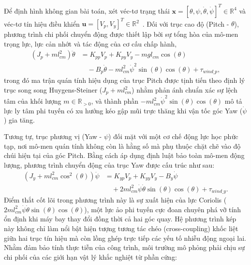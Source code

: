 \documentclass[conference, a4paper]{IEEEtran}
\begin{document}
Để định hình không gian bài toán, xét véc-tơ trạng thái $\mathbf{x} = [\theta, \psi, \dot{\theta}, \dot{\psi}]^T \in \mathbb{R}^4$ và véc-tơ tín hiệu điều khiển $\mathbf{u} = [V_p, V_y]^T \in \mathbb{R}^2$~\cite{8592714}. Đối với trục cao độ (Pitch - $\theta$), phương trình chi phối chuyển động được thiết lập bởi sự tổng hòa của mô-men trọng lực, lực cản nhớt và tác động của cơ cấu chấp hành,
\begin{equation}
\begin{aligned}
(J_p + m l_{cm}^2) \ddot{\theta} &= K_{pp} V_p + K_{py} V_y - m g l_{cm} \cos(\theta) \\
&\quad - B_p \dot{\theta} - m l_{cm}^2 \dot{\psi}^2 \sin(\theta)\cos(\theta) + \tau_{wind\_p},
\end{aligned}
\end{equation}
trong đó ma trận quán tính hiệu dụng của trục Pitch được tịnh tiến theo định lý trục song song Huygens-Steiner ($J_p + m l_{cm}^2$) nhằm phản ánh chuẩn xác sự lệch tâm của khối lượng $m \in \mathbb{R}_{>0}$, và thành phần $-m l_{cm}^2 \dot{\psi}^2 \sin(\theta)\cos(\theta)$ mô tả lực ly tâm phi tuyến có xu hướng kéo gập mũi trực thăng khi vận tốc góc Yaw ($\dot{\psi}$) gia tăng.

Tương tự, trục phương vị (Yaw - $\psi$) đối mặt với một cơ chế động lực học phức tạp, nơi mô-men quán tính không còn là hằng số mà phụ thuộc chặt chẽ vào độ chúi hiện tại của góc Pitch. Bằng cách áp dụng định luật bảo toàn mô-men động lượng, phương trình chuyển động của trục Yaw được cấu trúc như sau:
\begin{equation}
\begin{aligned}
(J_y + m l_{cm}^2 \cos^2(\theta)) \ddot{\psi} &= K_{yp} V_p + K_{yy} V_y - B_y \dot{\psi} \\
&\quad + 2m l_{cm}^2 \dot{\psi}\dot{\theta} \sin(\theta)\cos(\theta) + \tau_{wind\_y}.
\end{aligned}
\end{equation}
Điểm thắt cốt lõi trong phương trình này là sự xuất hiện của lực Coriolis ($2m l_{cm}^2 \dot{\psi}\dot{\theta} \sin(\theta)\cos(\theta)$), một lực ảo phi tuyến cực đoan chuyên phá vỡ tính ổn định khi máy bay thay đổi đồng thời cả hai góc quay. Hệ phương trình kép này không chỉ làm nổi bật hiện tượng tương tác chéo (cross-coupling) khốc liệt giữa hai trục tín hiệu mà còn lồng ghép trực tiếp các yếu tố nhiễu động ngoại lai. Nhằm đảm bảo tính thực tiễn của công trình, môi trường mô phỏng phải chịu sự chi phối của các giới hạn vật lý khắc nghiệt từ phần cứng:
\end{document}

